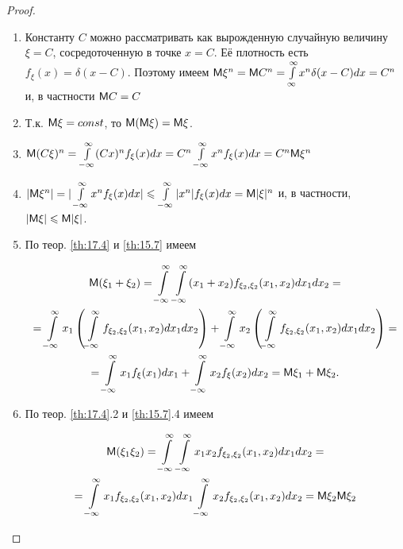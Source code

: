 \begin{proof}
	\begin{enumerate}
		\item Константу $C$ можно рассматривать как вырожденную случайную величину $\xi = C$, сосредоточенную в точке $x = C$. Её плотность есть $f_{\xi}(x)=\delta(x-C)$. Поэтому имеем $\mathsf{M}\xi^n=\mathsf{M} C^n=\int\limits^{\infty}_{\infty} x^n\delta(x-C)dx=C^n$ и, в частности $\mathsf{M} C=C$

		\item Т.к. $\mathsf{M}\xi=const$, то $\mathsf{M}(\mathsf{M}\xi)=\mathsf{M}\xi$.

		\item $\mathsf{M}(C\xi)^n=\int\limits^{\infty}_{-\infty}(Cx)^nf_{\xi}(x)dx=C^n\int\limits^{\infty}_{-\infty}x^nf_{\xi}(x)dx=C^n\mathsf{M} \xi^n$
		
		\item $|\mathsf{M}\xi^n|=|\int\limits^{\infty}_{-\infty}x^nf_{\xi}(x)dx|\leqslant\int\limits^{\infty}_{-\infty}|x^n|f_{\xi}(x)dx=
		\mathsf{M}|\xi|^n$ и, в частности, $|\mathsf{M}\xi|\leqslant\mathsf{M}|\xi|$.

		\item По теор. \ref{th:17.4} и \ref{th:15.7} имеем

			\begin{gather*}
				\mathsf{M}(\xi_1+\xi_2)=
				\int\limits^{\infty}_{-\infty}
				\int\limits^{\infty}_{-\infty}
				(x_1+x_2)
				f_{\xi_2,\xi_2}(x_1,x_2)dx_1dx_2
				=\\=
				\int\limits^{\infty}_{-\infty}
				x_1
				\left(\int\limits^{\infty}_{-\infty} 
				f_{\xi_2,\xi_2}(x_1,x_2)dx_1dx_2
				\right)
				+
				\int\limits^{\infty}_{-\infty}
				x_2
				\left(\int\limits^{\infty}_{-\infty} 
				f_{\xi_2,\xi_2}(x_1,x_2)dx_1dx_2
				\right)
				=\\=
				\int\limits^{\infty}_{-\infty}
				x_1 f_{\xi}(x_1)dx_1+
				\int\limits^{\infty}_{-\infty}
				x_2 f_{\xi}(x_2)dx_2=
				\mathsf{M}\xi_1+\mathsf{M}\xi_2.
			\end{gather*}
		\item По теор. \ref{th:17.4}.2 и \ref{th:15.7}.4 имеем

			\begin{gather*}
				\mathsf{M}(\xi_1\xi_2)=
				\int\limits^{\infty}_{-\infty}\int\limits^{\infty}_{-\infty}
				x_1x_2f_{\xi_2,\xi_2}(x_1,x_2)dx_1dx_2
				=\\=
				\int\limits^{\infty}_{-\infty}
				x_1f_{\xi_2,\xi_2}(x_1,x_2)dx_1 
				\int\limits^{\infty}_{-\infty}
				x_2f_{\xi_2,\xi_2}(x_1,x_2)dx_2=
				\mathsf{M}\xi_2\mathsf{M}\xi_2
			\end{gather*}
	\end{enumerate}
\end{proof}

